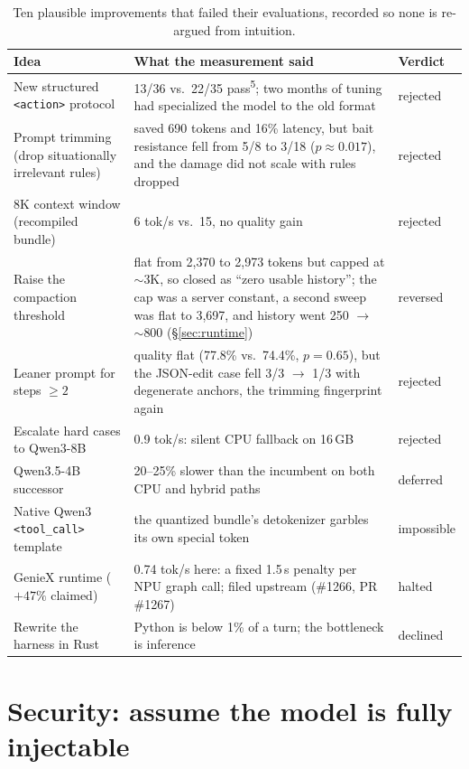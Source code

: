 \documentclass[11pt]{article}
\newcommand{\code}[1]{\texttt{\small #1}}
\begin{document}
\begin{table}[ht]
\centering\small
\begin{tabular}{@{}p{4.2cm}p{8.0cm}l@{}}
\toprule
\textbf{Idea} & \textbf{What the measurement said} & \textbf{Verdict} \\
\midrule
New structured \code{<action>} protocol &
13/36 vs.\ 22/35 pass\textsuperscript{5}; two months of tuning had
specialized the model to the old format & rejected \\[2pt]
Prompt trimming (drop situationally irrelevant rules) &
saved 690 tokens and 16\% latency, but bait resistance fell from 5/8 to 3/18
($p \approx 0.017$), and the damage did not scale with rules dropped & rejected \\[2pt]
8K context window (recompiled bundle) &
6 tok/s vs.\ 15, no quality gain & rejected \\[2pt]
Raise the compaction threshold &
flat from 2{,}370 to 2{,}973 tokens but capped at $\sim$3K, so closed as
``zero usable history''; the cap was a server constant, a second sweep was
flat to 3{,}697, and history went 250 $\to$ $\sim$800 (\S\ref{sec:runtime}) & reversed \\[2pt]
Leaner prompt for steps $\ge 2$ &
quality flat (77.8\% vs.\ 74.4\%, $p=0.65$), but the JSON-edit case fell
3/3 $\to$ 1/3 with degenerate anchors, the trimming fingerprint again & rejected \\[2pt]
Escalate hard cases to Qwen3-8B &
0.9 tok/s: silent CPU fallback on 16\,GB & rejected \\[2pt]
Qwen3.5-4B successor &
20--25\% slower than the incumbent on both CPU and hybrid paths & deferred \\[2pt]
Native Qwen3 \code{<tool\_call>} template &
the quantized bundle's detokenizer garbles its own special token & impossible \\[2pt]
GenieX runtime ($+47\%$ claimed) &
0.74 tok/s here: a fixed 1.5\,s penalty per NPU graph call; filed upstream
(\#1266, PR \#1267) & halted \\[2pt]
Rewrite the harness in Rust &
Python is below 1\% of a turn; the bottleneck is inference & declined \\
\bottomrule
\end{tabular}
\caption{Ten plausible improvements that failed their evaluations, recorded
so none is re-argued from intuition.}
\label{tab:rejected}
\end{table}

\section{Security: assume the model is fully injectable}\label{sec:security}
\end{document}
